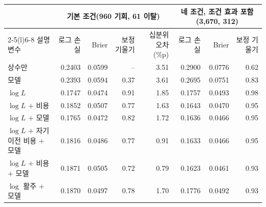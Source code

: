 \begin{tabular}{lrrrrrrr}
\toprule
 & \multicolumn{4}{c}{기본 조건(960 기회, 61 이탈)} & \multicolumn{3}{c}{네 조건, 조건 효과 포함(3,670, 312)} \\
\cmidrule(lr){2-5}\cmidrule(l){6-8}
설명 변수 & 로그 손실 & Brier & 보정 기울기 & 십분위 오차(\%p) & 로그 손실 & Brier & 보정 기울기 \\
\midrule
상수만 & 0.2403 & 0.0599 & -- & 3.51 & 0.2900 & 0.0776 & 0.62 \\
모델 & 0.2393 & 0.0594 & 0.37 & 3.61 & 0.2695 & 0.0751 & 0.83 \\
$\log L$ & 0.1747 & 0.0474 & 0.91 & 1.85 & 0.1757 & 0.0493 & 0.98 \\
$\log L$ $+$ 비용 & 0.1852 & 0.0507 & 0.77 & 1.63 & 0.1643 & 0.0470 & 0.95 \\
$\log L$ $+$ 모델 & 0.1765 & 0.0472 & 0.82 & 1.72 & 0.1636 & 0.0466 & 0.95 \\
$\log L$ $+$ 자기 이전 비용 $+$ 모델 & 0.1816 & 0.0486 & 0.77 & 0.91 & 0.1633 & 0.0466 & 0.95 \\
$\log L$ $+$ 비용 $+$ 모델 & 0.1871 & 0.0505 & 0.72 & 0.79 & 0.1623 & 0.0461 & 0.93 \\
$\log$ 활주 $+$ 모델 & 0.1870 & 0.0497 & 0.78 & 1.70 & 0.1776 & 0.0492 & 0.93 \\
\bottomrule
\end{tabular}
